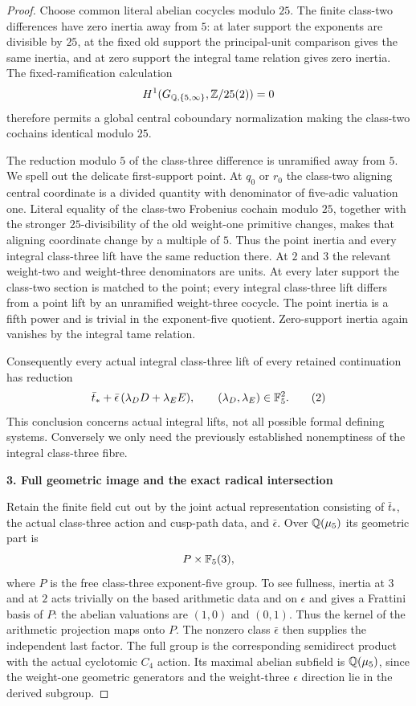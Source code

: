 \begin{proof}
Choose common literal abelian cocycles modulo $25$. The finite class-two differences have zero inertia away from $5$: at later support the exponents are divisible by $25$, at the fixed old support the principal-unit comparison gives the same inertia, and at zero support the integral tame relation gives zero inertia. The fixed-ramification calculation
\[
 H^1(G_{\mathbb Q,\{5,\infty\}},\mathbb Z/25(2))=0
\]
therefore permits a global central coboundary normalization making the class-two cochains identical modulo $25$.

The reduction modulo $5$ of the class-three difference is unramified away from $5$. We spell out the delicate first-support point. At $q_0$ or $r_0$ the class-two aligning central coordinate is a divided quantity with denominator of five-adic valuation one. Literal equality of the class-two Frobenius cochain modulo $25$, together with the stronger $25$-divisibility of the old weight-one primitive changes, makes that aligning coordinate change by a multiple of $5$. Thus the point inertia and every integral class-three lift have the same reduction there. At $2$ and $3$ the relevant weight-two and weight-three denominators are units. At every later support the class-two section is matched to the point; every integral class-three lift differs from a point lift by an unramified weight-three cocycle. The point inertia is a fifth power and is trivial in the exponent-five quotient. Zero-support inertia again vanishes by the integral tame relation.

Consequently every actual integral class-three lift of every retained continuation has reduction
\[
 \bar t_*+\bar\epsilon\,(\lambda_DD+\lambda_EE),
 \qquad (\lambda_D,\lambda_E)\in\mathbb F_5^2.
 \tag{2}
\]
This conclusion concerns actual integral lifts, not all possible formal defining systems. Conversely we only need the previously established nonemptiness of the integral class-three fibre.

\par\medskip\noindent\textbf{3. Full geometric image and the exact radical intersection}\par\nobreak\smallskip
Retain the finite field cut out by the joint actual representation consisting of $\bar t_*$, the actual class-three action and cusp-path data, and $\bar\epsilon$. Over $\mathbb Q(\mu_5)$ its geometric part is
\[
 P\times\mathbb F_5(3),
\]
where $P$ is the free class-three exponent-five group. To see fullness, inertia at $3$ and at $2$ acts trivially on the based arithmetic data and on $\epsilon$ and gives a Frattini basis of $P$: the abelian valuations are $(1,0)$ and $(0,1)$. Thus the kernel of the arithmetic projection maps onto $P$. The nonzero class $\bar\epsilon$ then supplies the independent last factor. The full group is the corresponding semidirect product with the actual cyclotomic $C_4$ action. Its maximal abelian subfield is $\mathbb Q(\mu_5)$, since the weight-one geometric generators and the weight-three $\epsilon$ direction lie in the derived subgroup.


\end{proof}
